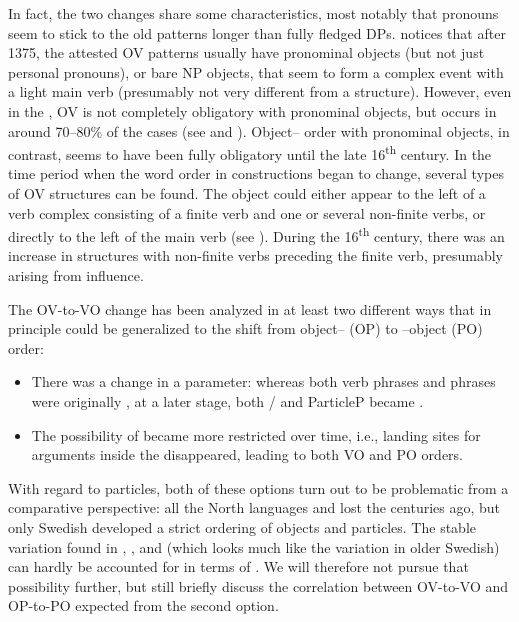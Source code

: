 \documentclass[output=paper]{langscibook}
\begin{document}
In fact, the two changes share some characteristics, most notably that pronouns seem to stick to the old patterns longer than fully fledged DPs. \citet[174]{Delsing1999} notices that after 1375, the attested OV patterns usually have pronominal objects (but not just personal pronouns), or bare NP objects, that seem to form a complex event with a light main verb (presumably not very different from a  structure). However, even in the , OV is not completely obligatory with pronominal objects, but occurs in around 70–80\% of the cases (see \citealt{Delsing1999} and ). Object– order with pronominal objects, in contrast, seems to have been fully obligatory until the late 16\textsuperscript{th} century. In the time period when the word order in  constructions began to change, several types of OV structures can be found. The object could either appear to the left of a verb complex consisting of a finite verb and one or several non-finite verbs, or directly to the left of the main verb (see \citealt{Petzell2011, Petzell2012}). During the 16\textsuperscript{th} century, there was an increase in structures with non-finite verbs preceding the finite verb, presumably arising from  influence.



The OV-to-VO change has been analyzed in at least two different ways that in principle could be generalized to the shift from object– (OP) to –object (PO) order: 


\begin{itemize}
\item There was a change in a  parameter: whereas both verb phrases and  phrases were originally , at a later stage, both / and ParticleP became .
\item The possibility of  became more restricted over time, i.e., landing sites for arguments inside the  disappeared, leading to both VO and PO orders.
\end{itemize}

With regard to particles, both of these options turn out to be problematic from a comparative perspective: all the North  languages and  lost the  centuries ago, but only Swedish developed a strict ordering of objects and particles. The stable variation found in , , and  (which looks much like the variation in older Swedish) can hardly be accounted for in terms of . We will therefore not pursue that possibility further, but still briefly discuss the correlation between OV-to-VO and OP-to-PO expected from the second option.
\end{document}
